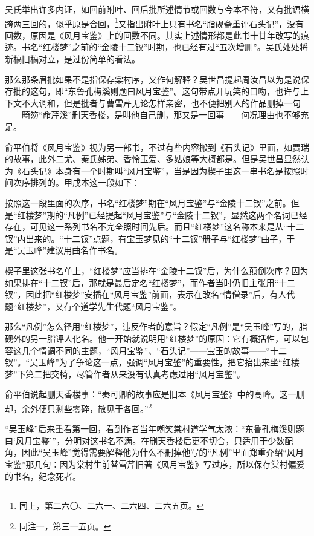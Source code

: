 \par 吴氏举出许多内证，如回前附叶、回后批所述情节或回数与今本不符，又有批语横跨两三回的，似乎原是合回，\footnote{同上，第二六〇、二六一、二六四、二六五页。}又指出附叶上只有书名“脂砚斋重评石头记”，没有回数，原因是《风月宝鉴》上的回数不同。其实上述情形都是此书十廿年改写的痕迹。书名“红楼梦”之前的“金陵十二钗”时期，也已经有过“五次增删”。吴氏处处将新稿旧稿对立，是过份简单的看法。
\par 那么那条眉批如果不是指保存棠村序，又作何解释？吴世昌提起周汝昌以为是说保存批的这句，即“东鲁孔梅溪则题曰风月宝鉴”。这句带点开玩笑的口吻，也许与上下文不大调和，但是批者与曹雪芹无论怎样亲密，也不便把别人的作品删掉一句——畸笏“命芹溪”删天香楼，是叫他自己删，那又是一回事——何况理由也不够充足。
\par 俞平伯将《风月宝鉴》视为另一部书，不过有些内容搬到《石头记》里面，如贾瑞的故事，此外二尤、秦氏姊弟、香怜玉爱、多姑娘等大概都是。但是吴世昌显然认为《石头记》本身有一个时期叫“风月宝鉴”，当是因为楔子里这一串书名是按照时间次序排列的。甲戌本这一段如下：
\par 按照这一段里面的次序，书名“红楼梦”期在“风月宝鉴”与“金陵十二钗”之前。但是“红楼梦”期的“凡例”已经提起“风月宝鉴”与“金陵十二钗”，显然这两个名词已经存在，可见这一系列书名不完全照时间先后。而且“红楼梦”这名称本来是从“十二钗”内出来的。“十二钗”点题，有宝玉梦见的“十二钗”册子与“红楼梦”曲子，于是“吴玉峰”建议用曲名作书名。
\par 楔子里这张书名单上，“红楼梦”应当排在“金陵十二钗”后，为什么颠倒次序？因为如果排在“十二钗”后，那就是最后定名“红楼梦”，而作者当时仍旧主张用“十二钗”，因此把“红楼梦”安插在“风月宝鉴”前面，表示在改名“情僧录”后，有人代题“红楼梦”，又有个道学先生代题“风月宝鉴”。
\par 那么“凡例”怎么径用“红楼梦”，违反作者的意旨？假定“凡例”是“吴玉峰”写的，脂砚外的另一脂评人化名。他一开始就说明用“红楼梦”的原因：它有概括性，可以包容这几个情调不同的主题，“风月宝鉴”、“石头记”——宝玉的故事——“十二钗”。“吴玉峰”为了争论这一点，强调“风月宝鉴”的重要性，把它抬出来坐“红楼梦”下第二把交椅，尽管作者从来没有认真考虑过用“风月宝鉴”。
\par 俞平伯说起删天香楼事：“秦可卿的故事应是旧本《风月宝鉴》中的高峰。这一删却，余外便只剩些零碎，散见于各回。”\footnote{同注一，第三一五页。}
\par “吴玉峰”后来重看第一回，看到作者当年嘲笑棠村道学气太浓：“东鲁孔梅溪则题曰‘风月宝鉴’”，分明对这书名不满。在删天香楼后更不切合，只适用于少数配角，因此“吴玉峰”觉得需要解释他为什么不删掉他写的“凡例”里面郑重介绍“风月宝鉴”那几句：因为棠村生前替雪芹旧著《风月宝鉴》写过序，所以保存棠村偏爱的书名，纪念死者。
